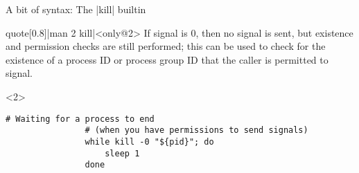 \begin{frame}[fragile]{A bit of syntax: The \bash|kill| builtin}
\begin{overlayarea}{\textwidth}{0.7\textheight}
        \vspace{-2mm}
        \begin{varblock}{quote}[0.8\textwidth]{\bash|man 2 kill|}<only@2>
            If signal is 0, then no signal is sent, but existence and permission checks are still performed; this can be used to check for the existence of a process ID or process group ID that the caller is permitted to signal.
        \end{varblock}
        \begin{onlyenv}<2>
            \begin{lstlisting}[style=MyBash, aboveskip=2mm]
                # Waiting for a process to end
                # (when you have permissions to send signals)
                while kill -0 "${pid}"; do
                    sleep 1
                done
            \end{lstlisting}
        \end{onlyenv}
    \end{overlayarea}
\end{frame}
